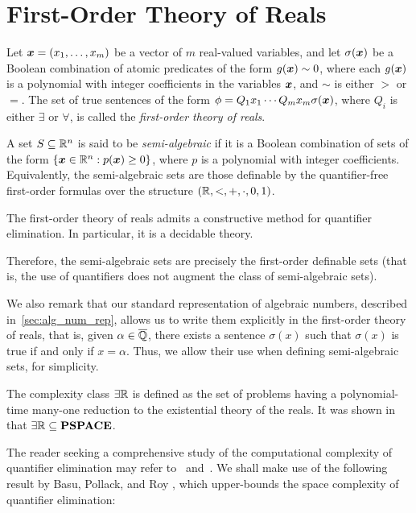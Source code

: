 \section{First-Order Theory of Reals}

Let $\boldsymbol{x}=(x_1,\ldots,x_m)$ be a vector of $m$ real-valued
variables, and let $\sigma(\boldsymbol{x})$ be a Boolean combination
of atomic predicates of the form $g(\boldsymbol{x})\sim 0$, where each
$g(\boldsymbol{x})$ is a polynomial with integer coefficients in the
variables $\boldsymbol{x}$, and $\sim$ is either $>$ or $=$.
The set of true sentences of the form $\phi=Q_1 x_1 \cdots Q_m x_m
\sigma(\boldsymbol{x})$, where $Q_i$ is either $\exists$ or
$\forall$, is called the \emph{first-order theory of reals}.

A set $S \subseteq \mathbb{R}^{n}$ is said to be \emph{semi-algebraic} if it is a Boolean combination of sets of the form $\lbrace \boldsymbol{x} \in \mathbb{R}^{n}: p(\boldsymbol{x}) \geq 0\rbrace$, where $p$ is a polynomial with integer coefficients. Equivalently, the semi-algebraic sets are those definable by the quantifier-free first-order formulas over the structure $(\mathbb{R}, <, +, \cdot, 0, 1)$.

\begin{theorem}
  The first-order theory of reals admits a constructive method for quantifier elimination. In particular, it is a decidable theory.~\cite{Tar51}
\end{theorem}

Therefore, the semi-algebraic sets are precisely the first-order definable sets (that is, the use of quantifiers does not augment the class of semi-algebraic sets).

We also remark that our standard representation of algebraic numbers, described in~\cref{sec:alg_num_rep}, allows us to write them explicitly in the first-order theory of reals, that is, given $\alpha\in\overline{\mathbb{Q}}$, there exists a sentence $\sigma(x)$ such that $\sigma(x)$ is true if and only if $x=\alpha$. Thus, we allow their use when defining semi-algebraic sets, for simplicity.

The complexity class $\exists\mathbb{R}$ is defined as the set of problems having a polynomial-time many-one reduction to the existential theory of the reals. It was shown in~\cite{Canny88} that $\exists\mathbb{R}\subseteq \textbf{PSPACE}$.

The reader seeking a comprehensive study of the computational complexity of quantifier elimination may refer to~\cite{Renegar} and~\cite{BPR06}. We shall make use of the following result by Basu, Pollack, and Roy
\cite{BasuPR96}, which upper-bounds the space complexity of quantifier elimination:

